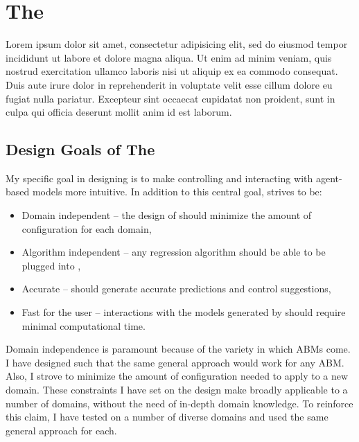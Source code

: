 \chapter{The \FRAMEWORK}
\thispagestyle{plain}

\label{Framework}

Lorem ipsum dolor sit amet, consectetur adipisicing elit, sed do eiusmod tempor incididunt ut labore et dolore magna aliqua. Ut enim ad minim veniam, quis nostrud exercitation ullamco laboris nisi ut aliquip ex ea commodo consequat. Duis aute irure dolor in reprehenderit in voluptate velit esse cillum dolore eu fugiat nulla pariatur. Excepteur sint occaecat cupidatat non proident, sunt in culpa qui officia deserunt mollit anim id est laborum.

\section{Design Goals of The \framework}

My specific goal in designing \fw is to make controlling and interacting with agent-based models more intuitive.
In addition to this central goal, \fw strives to be:
\begin{itemize}
  \item Domain independent -- the design of \fw should minimize the amount of configuration for each domain,
  \item Algorithm independent -- any regression algorithm should be able to be plugged into \fw,
  \item Accurate -- \fw should generate accurate predictions and control suggestions,
  \item Fast for the user -- interactions with the models generated by \fw should require minimal computational time.
\end{itemize}

Domain independence is paramount because of the variety in which ABMs come.
I have designed \fw such that the same general approach would work for any ABM.
Also, I strove to minimize the amount of configuration needed to apply \fw to a new domain.
These constraints I have set on the design make \fw broadly applicable to a number of domains, without the need of in-depth domain knowledge.
To reinforce this claim, I have tested \fw on a number of diverse domains and used the same general approach for each.


